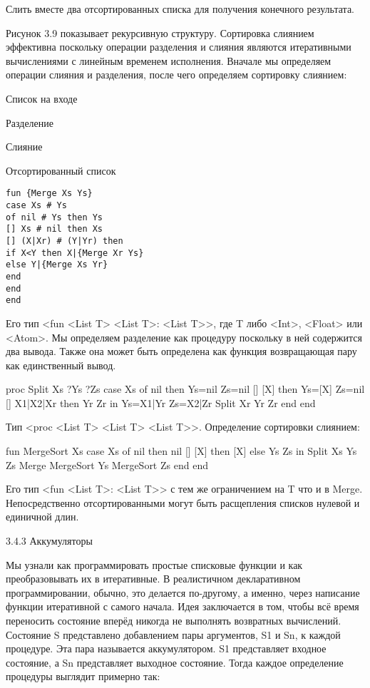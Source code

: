Слить вместе два отсортированных списка для получения конечного результата.

Рисунок 3.9 показывает рекурсивную структуру. Сортировка слиянием эффективна поскольку операции разделения и слияния являются итеративными вычислениями с линейным временем исполнения. Вначале мы определяем операции слияния и разделения, после чего определяем сортировку слиянием:

Список на входе

Разделение

Слияние

Отсортированный список

\begin{lstlisting}
fun {Merge Xs Ys}
case Xs # Ys
of nil # Ys then Ys
[] Xs # nil then Xs
[] (X|Xr) # (Y|Yr) then
if X<Y then X|{Merge Xr Ys}
else Y|{Merge Xs Yr}
end
end
end
\end{lstlisting}

Его тип <fun { <List T> <List T>}: <List T>>, где T либо <Int>, <Float> или <Atom>. Мы определяем разделение как процедуру поскольку в ней содержится два вывода. Также она может быть определена как функция возвращающая пару как единственный вывод.

proc {Split Xs ?Ys ?Zs}
case Xs
of nil then Ys=nil Zs=nil
[] [X] then Ys=[X] Zs=nil
[] X1|X2|Xr then Yr Zr in
Ys=X1|Yr
Zs=X2|Zr
{Split Xr Yr Zr}
end
end

Тип <proc { <List T> <List T> <List T>}>. Определение сортировки слиянием:

fun {MergeSort Xs}
case Xs
of nil then nil
[] [X] then [X]
else Ys Zs in
{Split Xs Ys Zs}
{Merge {MergeSort Ys} {MergeSort Zs}}
end
end

Его тип <fun { <List T>}: <List T>> с тем же ограничением на T что и в Merge. Непосредственно отсортированными могут быть расщепления списков нулевой и единичной длин.

3.4.3 Аккумуляторы

Мы узнали как программировать простые списковые функции и как преобразовывать их в итеративные. В реалистичном декларативном программировании, обычно, это делается по-другому, а именно, через написание функции итеративной с самого начала. Идея заключается в том, чтобы всё время переносить состояние вперёд никогда не выполнять возвратных вычислений. Состояние S представлено добавлением пары аргументов, S1 и Sn, к каждой процедуре. Эта пара называется аккумулятором. S1 представляет входное состояние, а Sn представляет выходное состояние. Тогда каждое определение процедуры выглядит примерно так:

